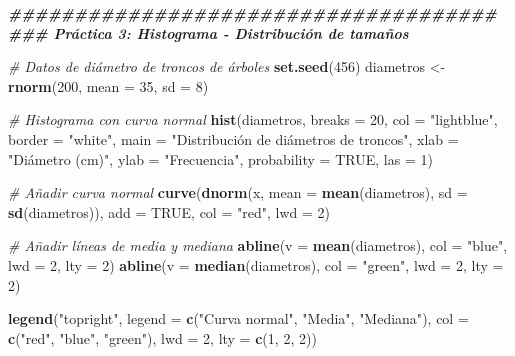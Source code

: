 \documentclass[
]{article}
\newenvironment{Shaded}{\begin{snugshade}}{\end{snugshade}}
\newcommand{\AttributeTok}[1]{\textcolor[rgb]{0.13,0.29,0.53}{#1}}
\newcommand{\CommentTok}[1]{\textcolor[rgb]{0.56,0.35,0.01}{\textit{#1}}}
\newcommand{\ConstantTok}[1]{\textcolor[rgb]{0.56,0.35,0.01}{#1}}
\newcommand{\DecValTok}[1]{\textcolor[rgb]{0.00,0.00,0.81}{#1}}
\newcommand{\DocumentationTok}[1]{\textcolor[rgb]{0.56,0.35,0.01}{\textbf{\textit{#1}}}}
\newcommand{\FunctionTok}[1]{\textcolor[rgb]{0.13,0.29,0.53}{\textbf{#1}}}
\newcommand{\NormalTok}[1]{#1}
\newcommand{\OtherTok}[1]{\textcolor[rgb]{0.56,0.35,0.01}{#1}}
\newcommand{\StringTok}[1]{\textcolor[rgb]{0.31,0.60,0.02}{#1}}
\begin{document}
\begin{Shaded}
\begin{Highlighting}[]
\DocumentationTok{\#\#\#\#\#\#\#\#\#\#\#\#\#\#\#\#\#\#\#\#\#\#\#\#\#\#\#\#\#\#\#\#\#\#\#\#\#}
\DocumentationTok{\#\#\# Práctica 3: Histograma {-} Distribución de tamaños}

\CommentTok{\# Datos de diámetro de troncos de árboles}
\FunctionTok{set.seed}\NormalTok{(}\DecValTok{456}\NormalTok{)}
\NormalTok{diametros }\OtherTok{\textless{}{-}} \FunctionTok{rnorm}\NormalTok{(}\DecValTok{200}\NormalTok{, }\AttributeTok{mean =} \DecValTok{35}\NormalTok{, }\AttributeTok{sd =} \DecValTok{8}\NormalTok{)}

\CommentTok{\# Histograma con curva normal}
\FunctionTok{hist}\NormalTok{(diametros,}
     \AttributeTok{breaks =} \DecValTok{20}\NormalTok{,}
     \AttributeTok{col =} \StringTok{"lightblue"}\NormalTok{,}
     \AttributeTok{border =} \StringTok{"white"}\NormalTok{,}
     \AttributeTok{main =} \StringTok{"Distribución de diámetros de troncos"}\NormalTok{,}
     \AttributeTok{xlab =} \StringTok{"Diámetro (cm)"}\NormalTok{,}
     \AttributeTok{ylab =} \StringTok{"Frecuencia"}\NormalTok{,}
     \AttributeTok{probability =} \ConstantTok{TRUE}\NormalTok{,}
     \AttributeTok{las =} \DecValTok{1}\NormalTok{)}

\CommentTok{\# Añadir curva normal}
\FunctionTok{curve}\NormalTok{(}\FunctionTok{dnorm}\NormalTok{(x, }\AttributeTok{mean =} \FunctionTok{mean}\NormalTok{(diametros), }\AttributeTok{sd =} \FunctionTok{sd}\NormalTok{(diametros)),}
      \AttributeTok{add =} \ConstantTok{TRUE}\NormalTok{,}
      \AttributeTok{col =} \StringTok{"red"}\NormalTok{,}
      \AttributeTok{lwd =} \DecValTok{2}\NormalTok{)}

\CommentTok{\# Añadir líneas de media y mediana}
\FunctionTok{abline}\NormalTok{(}\AttributeTok{v =} \FunctionTok{mean}\NormalTok{(diametros), }\AttributeTok{col =} \StringTok{"blue"}\NormalTok{, }\AttributeTok{lwd =} \DecValTok{2}\NormalTok{, }\AttributeTok{lty =} \DecValTok{2}\NormalTok{)}
\FunctionTok{abline}\NormalTok{(}\AttributeTok{v =} \FunctionTok{median}\NormalTok{(diametros), }\AttributeTok{col =} \StringTok{"green"}\NormalTok{, }\AttributeTok{lwd =} \DecValTok{2}\NormalTok{, }\AttributeTok{lty =} \DecValTok{2}\NormalTok{)}

\FunctionTok{legend}\NormalTok{(}\StringTok{"topright"}\NormalTok{,}
       \AttributeTok{legend =} \FunctionTok{c}\NormalTok{(}\StringTok{"Curva normal"}\NormalTok{, }\StringTok{"Media"}\NormalTok{, }\StringTok{"Mediana"}\NormalTok{),}
       \AttributeTok{col =} \FunctionTok{c}\NormalTok{(}\StringTok{"red"}\NormalTok{, }\StringTok{"blue"}\NormalTok{, }\StringTok{"green"}\NormalTok{),}
       \AttributeTok{lwd =} \DecValTok{2}\NormalTok{,}
       \AttributeTok{lty =} \FunctionTok{c}\NormalTok{(}\DecValTok{1}\NormalTok{, }\DecValTok{2}\NormalTok{, }\DecValTok{2}\NormalTok{))}
\end{Highlighting}
\end{Shaded}
\end{document}
